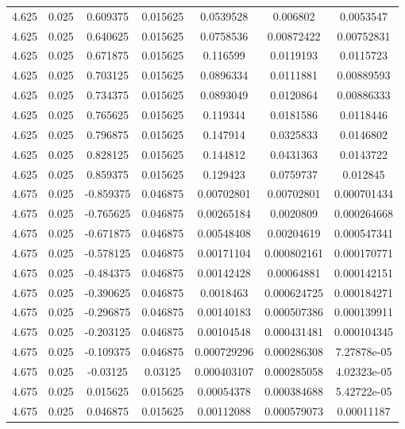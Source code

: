\begin{table}[bh]
\begin{center}
{\begin{tabular}{ccccccc}
4.625	 & 0.025 & 	0.609375	 & 0.015625	 & 0.0539528	 & 0.006802	 & 0.0053547 \\ 
4.625	 & 0.025 & 	0.640625	 & 0.015625	 & 0.0758536	 & 0.00872422	 & 0.00752831 \\ 
4.625	 & 0.025 & 	0.671875	 & 0.015625	 & 0.116599	 & 0.0119193	 & 0.0115723 \\ 
4.625	 & 0.025 & 	0.703125	 & 0.015625	 & 0.0896334	 & 0.0111881	 & 0.00889593 \\ 
4.625	 & 0.025 & 	0.734375	 & 0.015625	 & 0.0893049	 & 0.0120864	 & 0.00886333 \\ 
4.625	 & 0.025 & 	0.765625	 & 0.015625	 & 0.119344	 & 0.0181586	 & 0.0118446 \\ 
4.625	 & 0.025 & 	0.796875	 & 0.015625	 & 0.147914	 & 0.0325833	 & 0.0146802 \\ 
4.625	 & 0.025 & 	0.828125	 & 0.015625	 & 0.144812	 & 0.0431363	 & 0.0143722 \\ 
4.625	 & 0.025 & 	0.859375	 & 0.015625	 & 0.129423	 & 0.0759737	 & 0.012845 \\ 
4.675	 & 0.025 & 	-0.859375	 & 0.046875	 & 0.00702801	 & 0.00702801	 & 0.000701434 \\ 
4.675	 & 0.025 & 	-0.765625	 & 0.046875	 & 0.00265184	 & 0.0020809	 & 0.000264668 \\ 
4.675	 & 0.025 & 	-0.671875	 & 0.046875	 & 0.00548408	 & 0.00204619	 & 0.000547341 \\ 
4.675	 & 0.025 & 	-0.578125	 & 0.046875	 & 0.00171104	 & 0.000802161	 & 0.000170771 \\ 
4.675	 & 0.025 & 	-0.484375	 & 0.046875	 & 0.00142428	 & 0.00064881	 & 0.000142151 \\ 
4.675	 & 0.025 & 	-0.390625	 & 0.046875	 & 0.0018463	 & 0.000624725	 & 0.000184271 \\ 
4.675	 & 0.025 & 	-0.296875	 & 0.046875	 & 0.00140183	 & 0.000507386	 & 0.000139911 \\ 
4.675	 & 0.025 & 	-0.203125	 & 0.046875	 & 0.00104548	 & 0.000431481	 & 0.000104345 \\ 
4.675	 & 0.025 & 	-0.109375	 & 0.046875	 & 0.000729296	 & 0.000286308	 & 7.27878e-05 \\ 
4.675	 & 0.025 & 	-0.03125	 & 0.03125	 & 0.000403107	 & 0.000285058	 & 4.02323e-05 \\ 
4.675	 & 0.025 & 	0.015625	 & 0.015625	 & 0.00054378	 & 0.000384688	 & 5.42722e-05 \\ 
4.675	 & 0.025 & 	0.046875	 & 0.015625	 & 0.00112088	 & 0.000579073	 & 0.00011187 \\ 

\end{tabular}}
\end{center}
\end{table}
